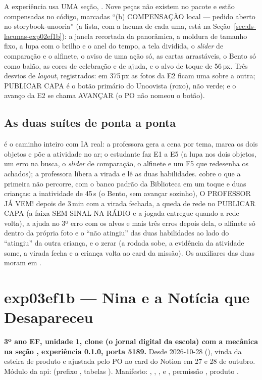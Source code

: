 A experiência usa UMA seção, . Nove peças não existem no pacote
e estão compensadas no código, marcadas \enquote{(b) COMPENSAÇÃO local ---
pedido aberto no storybook-unooria} (a lista, com a lacuna de cada uma, está
na Seção~\ref{sec:ds-lacunas-exp02ef1b}): a janela recortada da panorâmica, a
moldura de tamanho fixo, a lupa com o brilho e o anel do tempo, a tela
dividida, o \emph{slider} de comparação e o alfinete, o aviso de uma ação só,
as cartas arrastáveis, o Bento só como balão, as cores de celebração e de
ajuda, e o alvo de toque de 56\,px. Três desvios de \emph{layout},
registrados: em 375\,px as fotos da E2 ficam uma sobre a outra; PUBLICAR CAPA
é o botão primário do Unoovista (roxo), não verde; e o avanço da E2 se chama
AVANÇAR (o PO não nomeou o botão).

\subsection*{As duas suítes de ponta a ponta}

 é o caminho inteiro com IA
real: a professora gera a cena por tema, marca os dois objetos e põe a
atividade no ar; o estudante faz E1 a E5 (a lupa nos dois objetos, um erro na
busca, o \emph{slider} de comparação, o alfinete e um F5 que redesenha os
achados); a professora libera a virada e lê as duas habilidades.
 cobre o que a
primeira não percorre, com o banco padrão da Biblioteca em um toque e duas
crianças: a inatividade de 45\,s (o Bento, sem avançar sozinho), O PROFESSOR
JÁ VEM! depois de 3\,min com a virada fechada, a queda de rede no PUBLICAR
CAPA (a faixa SEM SINAL NA RÁDIO e a jogada entregue quando a rede volta), a
ajuda no 3º erro com os alvos e mais três erros depois dela, o alfinete só
dentro da própria foto e o \enquote{não atingiu} das duas habilidades ao lado
do \enquote{atingiu} da outra criança, e o zerar (a rodada sobe, a evidência
da atividade some, a virada fecha e a criança volta ao card da missão). Os
auxiliares das duas moram em .

\section{exp03ef1b --- Nina e a Notícia que Desapareceu}
\label{sec:exp03ef1b}

\textbf{3º ano EF, unidade 1, clone  (o jornal digital da
escola) com a mecânica na seção , experiência 0.1.0, porta 5189.}
Desde 2026-10-28 (), vinda da esteira de produto e ajustada pelo
PO no card do Notion em 27 e 28 de outubro. Módulo da api:
 (prefixo , tabelas ).
Manifesto: , , ,
 e , permissão , produto .

